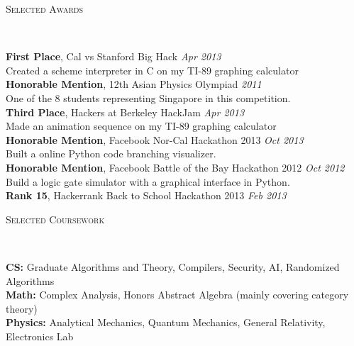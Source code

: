 \documentclass[9pt]{article}
\newenvironment{changemargin}[2]{%
  \begin{list}{}{%
      \setlength{\topsep}{0pt}%
      \setlength{\leftmargin}{#1}%
      \setlength{\rightmargin}{#2}%
      \setlength{\listparindent}{\parindent}%
      \setlength{\itemindent}{\parindent}%
      \setlength{\parsep}{\parskip}%
    }%
  \item[]}{\end{list}
}
\newcommand{\lineover}{
  \begin{changemargin}{-0.05in}{-0.05in}
    \vspace*{-8pt}
    \hrulefill \\
    \vspace*{-2pt}
  \end{changemargin}
}
\newcommand{\header}[1]{
  \begin{changemargin}{-0.5in}{-0.5in}
    \scshape{#1}\\
    \lineover
  \end{changemargin}
}
\newenvironment{body} {
  \vspace*{-16pt}
  \begin{changemargin}{-0.25in}{-0.5in}
  }
  {\end{changemargin}
}
\begin{document}
\header{Selected Awards}
\begin{body}
  \vspace{14pt}
  \textbf{First Place}, Cal vs Stanford Big Hack \hfill{} \emph{Apr 2013}\\
  Created a scheme interpreter in C on my TI-89 graphing calculator \\
  \textbf{Honorable Mention}, 12th Asian Physics Olympiad \hfill{} \emph{2011}\\
  One of the 8 students representing Singapore in this competition.\\
  \textbf{Third Place}, Hackers at Berkeley HackJam \hfill{} \emph{Apr 2013}\\
  Made an animation sequence on my TI-89 graphing calculator \\
  \textbf{Honorable Mention}, Facebook Nor-Cal Hackathon 2013 \hfill{} \emph{Oct 2013}\\
  Built a online Python code branching visualizer.\\
  \textbf{Honorable Mention}, Facebook Battle of the Bay Hackathon 2012 \hfill{} \emph{Oct 2012}\\
  Build a logic gate simulator with a graphical interface in Python. \\
  \textbf{Rank 15}, Hackerrank Back to School Hackathon 2013 \hfill{} \emph{Feb 2013}\\
\end{body}

\smallskip

\header{Selected Coursework}
\begin{body}
  \vspace{14pt}
  \textbf{CS:} Graduate Algorithms and Theory, Compilers, Security, AI, Randomized Algorithms \\
  \medskip
  \textbf{Math:} Complex Analysis, Honors Abstract Algebra (mainly covering category theory) \\
  \medskip
  \textbf{Physics:} Analytical Mechanics, Quantum Mechanics, General Relativity, Electronics Lab \\
  \medskip
\end{body}
\end{document}

